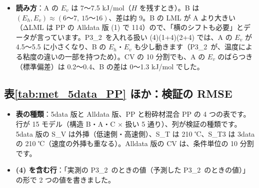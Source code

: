 \documentclass[paper=a4paper,fontsize=10.5pt,line_length=44zw,number_of_lines=38]{jlreq}
\newcommand{\Eh}{E_{h}}
\newcommand{\Ev}{E_{v}}
\newcommand{\PII}{P3\_2}
\newenvironment{points}{\begin{itemize}[label=$\triangleright$,leftmargin=1.5\zw,itemsep=0.3ex,topsep=0.5ex,parsep=0pt]}{\end{itemize}}
\newcommand{\pt}[1]{\item \textbf{#1}：}
\begin{document}
\begin{points}
\pt{読み方}A の $\Ev$ は 7〜7.5 kJ/mol（$H$ を残すとき）。B は $(\Eh,\Ev)\approx(6\text{〜}7,\ 15\text{〜}16)$、差は約 9。B の LML が A より大きい（ΔLML は PP の Alldata 版 (1) で 114）ので、「横のシフトも必要」とデータが言っています。\PII\ を入れる扱い (4)(1+4)(2+4) では、A の $\Ev$ が 4.5〜5.5 に小さくなり、B の $\Eh$・$\Ev$ も少し動きます（\PII\ が、温度による粘度の違いの一部を持つため）。CV の 10 分割でも、A の $\Ev$ のばらつき（標準偏差）は 0.2〜0.4、B の差は 0〜1.3 kJ/mol でした。
\end{points}

\subsection{表\ref{tab:met_5data_PP} ほか：検証の RMSE}
\begin{points}
\pt{表の種類}5data 版と Alldata 版、PP と粉砕材混合 PP の 4 つの表です。行が 15 モデル（構造 B・A・C $\times$ 扱い 5 通り）、列が検証の種類です。5data 版の S\_V は外挿（低速側・高速側）、S\_T は 210 ℃、S\_T3 は 3data の 210 ℃（速度の外挿も重なる）。Alldata 版の CV は、条件単位の 10 分割です。
\pt{(4) を含む行}「実測の \PII\ のときの値（予測した \PII\ のときの値）」の形で 2 つの値を書きました。
\end{points}
\end{document}
